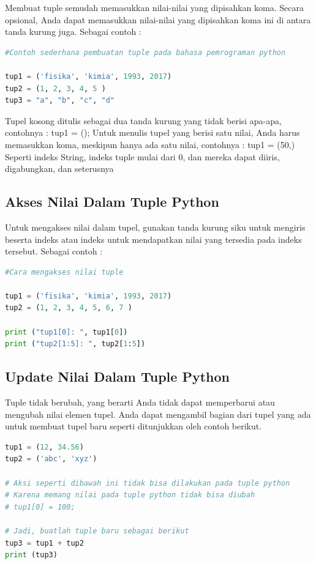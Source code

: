 Membuat tuple semudah memasukkan nilai-nilai yang dipisahkan koma. Secara opsional, Anda dapat memasukkan nilai-nilai yang dipisahkan koma ini di antara tanda kurung juga. Sebagai contoh :
\begin{lstlisting}[language=Python]
#Contoh sederhana pembuatan tuple pada bahasa pemrograman python

tup1 = ('fisika', 'kimia', 1993, 2017)
tup2 = (1, 2, 3, 4, 5 )
tup3 = "a", "b", "c", "d"
\end{lstlisting}

Tupel kosong ditulis sebagai dua tanda kurung yang tidak berisi apa-apa, contohnya : tup1 = (); Untuk menulis tupel yang berisi satu nilai, Anda harus memasukkan koma, meskipun hanya ada satu nilai, contohnya : tup1 = (50,) Seperti indeks String, indeks tuple mulai dari 0, dan mereka dapat diiris, digabungkan, dan seterusnya

\subsection{Akses Nilai Dalam Tuple Python}
Untuk mengakses nilai dalam tupel, gunakan tanda kurung siku untuk mengiris beserta indeks atau indeks untuk mendapatkan nilai yang tersedia pada indeks tersebut. Sebagai contoh :
\begin{lstlisting}[language=Python]
#Cara mengakses nilai tuple

tup1 = ('fisika', 'kimia', 1993, 2017)
tup2 = (1, 2, 3, 4, 5, 6, 7 )

print ("tup1[0]: ", tup1[0])
print ("tup2[1:5]: ", tup2[1:5])
\end{lstlisting}

\subsection{Update Nilai Dalam Tuple Python}
Tuple tidak berubah, yang berarti Anda tidak dapat memperbarui atau mengubah nilai elemen tupel. Anda dapat mengambil bagian dari tupel yang ada untuk membuat tupel baru seperti ditunjukkan oleh contoh berikut.

\begin{lstlisting}[language=Python]
tup1 = (12, 34.56)
tup2 = ('abc', 'xyz')

# Aksi seperti dibawah ini tidak bisa dilakukan pada tuple python
# Karena memang nilai pada tuple python tidak bisa diubah
# tup1[0] = 100;

# Jadi, buatlah tuple baru sebagai berikut
tup3 = tup1 + tup2
print (tup3)
\end{lstlisting}

